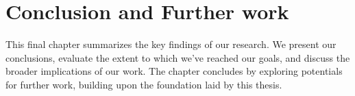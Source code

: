 \chapter{Conclusion and Further work}
\label{chap:conclusion}

This final chapter summarizes the key findings of our research. We present our conclusions, evaluate the extent to which we've reached our goals, and discuss the broader implications of our work. The chapter concludes by exploring potentials for further work, building upon the foundation laid by this thesis.



